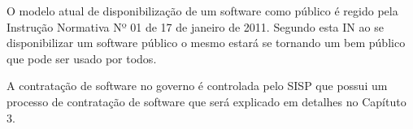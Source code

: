 O modelo atual de disponibilização de um software como público é
regido pela Instrução Normativa Nº 01 de 17 de janeiro de 2011. 
Segundo esta IN ao se disponibilizar um software público o mesmo estará se tornando um bem público
que pode ser usado por todos.

A contratação de software no governo é controlada pelo SISP que possui um processo de 
contratação de software que será explicado em detalhes no Capítuto 3.












